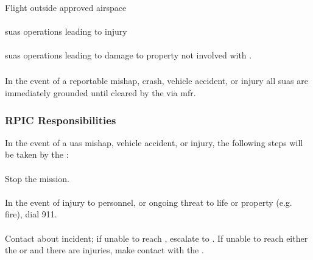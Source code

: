             \paragraph{}Flight outside approved airspace
        
            \paragraph{}\ac{suas} operations leading to injury
        
            \paragraph{}\ac{suas} operations leading to damage to property not involved with \projectmars{}.
        
        \subsubsection{} In the event of a reportable mishap, crash, vehicle accident, or injury all \projectmars{} \ac{suas} are immediately grounded until cleared by the  via \ac{mfr}.
        
        \subsubsection{RPIC Responsibilities}In the event of a \ac{uas} mishap, vehicle accident, or injury, the following steps will be taken by the :
        
            \paragraph{}Stop the mission.
        
            \paragraph{}In the event of injury to personnel, or ongoing threat to life or property (e.g. fire), dial 911.
             
            \paragraph{}Contact  about incident; if unable to reach , escalate to .  If unable to reach either the  or  and there are injuries, make contact with the .
        
